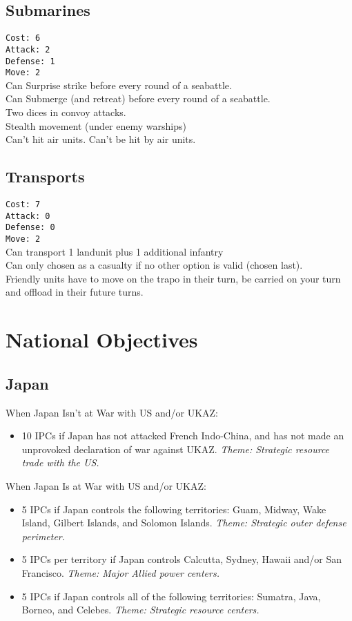 \documentclass[10pt,a4paper,landscape]{article}
\begin{document}
\begin{multicols*}{3}
\subsection*{Submarines}
\texttt{Cost: 6 \\ Attack: 2 \\ Defense: 1 \\ Move: 2}
\\
Can Surprise strike before every round of a seabattle.\\
Can Submerge (and retreat) before every round of a seabattle.\\
Two dices in convoy attacks.\\
Stealth movement (under enemy warships)\\
Can't hit air units. Can't be hit by air units.


\subsection*{Transports}
\texttt{Cost: 7 \\ Attack: 0 \\ Defense: 0 \\ Move: 2}
\\
Can transport 1 landunit plus 1 additional infantry\\
Can only chosen as a casualty if no other option is valid (\glqq chosen last\grqq).\\
Friendly units have to move on the trapo in their turn, be carried on your turn and offload in their future turns.

\pagebreak

\noindent
\begin{minipage}{\linewidth}
\section*{National Objectives}
\subsection*{Japan}
When Japan Isn't at War with US and/or UKAZ:
\begin{itemize}
\item 10 IPCs if Japan has not attacked French Indo-China, and has not made an unprovoked declaration of war against UKAZ. \textsl{Theme: Strategic resource trade with the US.}
\end{itemize}
When Japan Is at War with US and/or UKAZ:
\begin{itemize}
\item 5 IPCs if Japan controls the following territories: Guam, Midway, Wake Island, Gilbert Islands, and Solomon Islands. \textsl{Theme: Strategic outer defense perimeter.}
\item 5 IPCs per territory if Japan controls Calcutta, Sydney, Hawaii and/or San Francisco. \textsl{Theme: Major Allied power centers.}
\item 5 IPCs if Japan controls all of the following territories: Sumatra, Java, Borneo, and Celebes. \textsl{Theme: Strategic resource centers.}
\end{itemize}
\end{minipage}



\end{multicols*}
\end{document}
